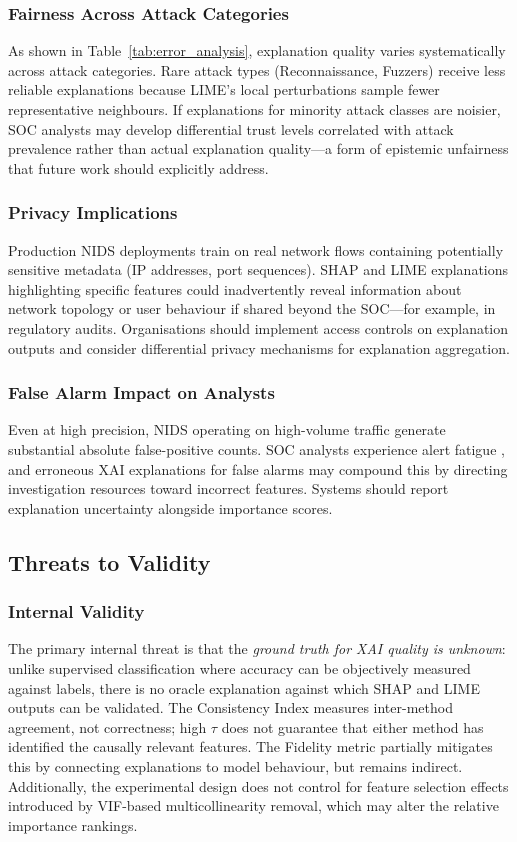 \documentclass[conference]{IEEEtran}
\begin{document}
\subsubsection{Fairness Across Attack Categories}
As shown in Table~\ref{tab:error_analysis}, explanation quality varies systematically across attack categories. Rare attack types (Reconnaissance, Fuzzers) receive less reliable explanations because LIME's local perturbations sample fewer representative neighbours. If explanations for minority attack classes are noisier, SOC analysts may develop differential trust levels correlated with attack prevalence rather than actual explanation quality---a form of epistemic unfairness that future work should explicitly address.

\subsubsection{Privacy Implications}
Production NIDS deployments train on real network flows containing potentially sensitive metadata (IP addresses, port sequences). SHAP and LIME explanations highlighting specific features could inadvertently reveal information about network topology or user behaviour if shared beyond the SOC---for example, in regulatory audits. Organisations should implement access controls on explanation outputs and consider differential privacy mechanisms for explanation aggregation.

\subsubsection{False Alarm Impact on Analysts}
Even at high precision, NIDS operating on high-volume traffic generate substantial absolute false-positive counts. SOC analysts experience alert fatigue \cite{pawlicki2024}, and erroneous XAI explanations for false alarms may compound this by directing investigation resources toward incorrect features. Systems should report explanation uncertainty alongside importance scores.

\subsection{Threats to Validity}

\subsubsection{Internal Validity}
The primary internal threat is that the \textit{ground truth for XAI quality is unknown}: unlike supervised classification where accuracy can be objectively measured against labels, there is no oracle explanation against which SHAP and LIME outputs can be validated. The Consistency Index measures inter-method agreement, not correctness; high $\tau$ does not guarantee that either method has identified the causally relevant features. The Fidelity metric partially mitigates this by connecting explanations to model behaviour, but remains indirect. Additionally, the experimental design does not control for feature selection effects introduced by VIF-based multicollinearity removal, which may alter the relative importance rankings.
\end{document}
